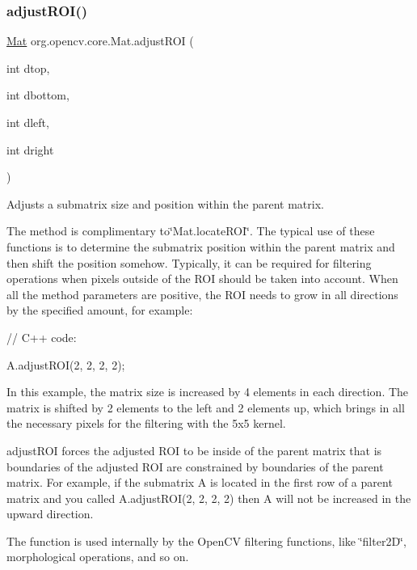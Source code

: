\subsubsection{\texorpdfstring{adjust\+R\+O\+I()}{adjustROI()}}
{\footnotesize\ttfamily \mbox{\hyperlink{classorg_1_1opencv_1_1core_1_1_mat}{Mat}} org.\+opencv.\+core.\+Mat.\+adjust\+R\+OI (\begin{DoxyParamCaption}\item[{int}]{dtop,  }\item[{int}]{dbottom,  }\item[{int}]{dleft,  }\item[{int}]{dright }\end{DoxyParamCaption})}

Adjusts a submatrix size and position within the parent matrix.

The method is complimentary to\char`\"{}\+Mat.\+locate\+R\+O\+I\char`\"{}. The typical use of these functions is to determine the submatrix position within the parent matrix and then shift the position somehow. Typically, it can be required for filtering operations when pixels outside of the R\+OI should be taken into account. When all the method parameters are positive, the R\+OI needs to grow in all directions by the specified amount, for example\+: {\ttfamily }

{\ttfamily }

{\ttfamily }

{\ttfamily // C++ code\+:}

{\ttfamily }

{\ttfamily }

{\ttfamily A.\+adjust\+R\+O\+I(2, 2, 2, 2);}

{\ttfamily }

{\ttfamily }

{\ttfamily In this example, the matrix size is increased by 4 elements in each direction. The matrix is shifted by 2 elements to the left and 2 elements up, which brings in all the necessary pixels for the filtering with the 5x5 kernel. }

{\ttfamily adjust\+R\+OI} forces the adjusted R\+OI to be inside of the parent matrix that is boundaries of the adjusted R\+OI are constrained by boundaries of the parent matrix. For example, if the submatrix {\ttfamily A} is located in the first row of a parent matrix and you called {\ttfamily A.\+adjust\+R\+OI(2, 2, 2, 2)} then {\ttfamily A} will not be increased in the upward direction.

The function is used internally by the Open\+CV filtering functions, like \char`\"{}filter2\+D\char`\"{}, morphological operations, and so on.


